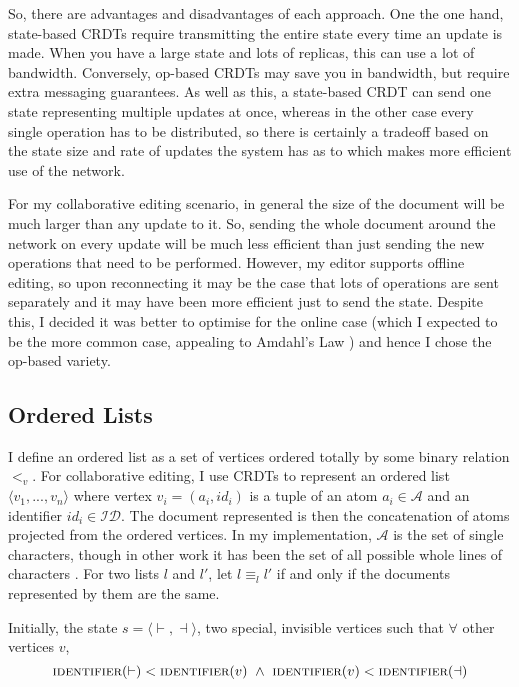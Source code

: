 \documentclass[diss.tex]{subfiles}
\begin{document}
So, there are advantages and disadvantages of each approach. One the one hand, state-based CRDTs require transmitting the entire state every time an update is made. When you have a large state and lots of replicas, this can use a lot of bandwidth. Conversely, op-based CRDTs may save you in bandwidth, but require extra messaging guarantees. As well as this, a state-based CRDT can send one state representing multiple updates at once, whereas in the other case every single operation has to be distributed, so there is certainly a tradeoff based on the state size and rate of updates the system has as to which makes more efficient use of the network.

For my collaborative editing scenario, in general the size of the document will be much larger than any update to it. So, sending the whole document around the network on every update will be much less efficient than just sending the new operations that need to be performed. However, my editor supports offline editing, so upon reconnecting it may be the case that lots of operations are sent separately and it may have been more efficient just to send the state. Despite this, I decided it was better to optimise for the online case (which I expected to be the more common case, appealing to Amdahl's Law \cite{amdahl}) and hence I chose the op-based variety.

\subsection{Ordered Lists}
 
I define an ordered list as a set of vertices ordered totally by some binary relation $<_v$. For collaborative editing, I use CRDTs to represent an ordered list $\langle v_1, ..., v_n\rangle$ where vertex $v_i = (a_i, id_i)$ is a tuple of an atom $a_i \in \mathcal{A}$ and an identifier $id_i \in \mathcal{ID}$. The document represented is then the concatenation of atoms projected from the ordered vertices. In my implementation, $\mathcal{A}$ is the set of single characters, though in other work it has been the set of all possible whole lines of characters \cite{logoot}. For two lists $l$ and $l'$, let $l \equiv_l l'$ if and only if the documents represented by them are the same.

Initially, the state $s = \langle \vdash, \dashv\rangle$, two special, invisible vertices such that $\forall $ other vertices $v$,  $$\textsc{identifier}(\vdash) < \textsc{identifier}(v) ~\wedge~ \textsc{identifier}(v) <\textsc{identifier}(\dashv)$$
\end{document}
